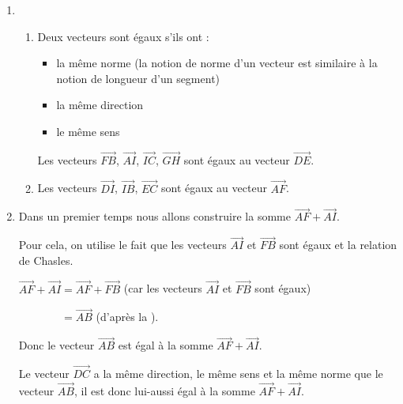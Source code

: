 \begin{corrige}
     \begin{enumerate}
          \item
          \begin{enumerate}[label=\alph*.]
               \item
               Deux vecteurs sont égaux s'ils ont :
               \begin{itemize}
                    \item
                    la même norme (la notion de norme d'un vecteur est similaire à la notion de longueur d'un segment)
                    \item
                    la même direction
                    \item
                    le même sens
               \end{itemize}

\begin{center}
\end{center}

               Les vecteurs $\overrightarrow{FB}$, $\overrightarrow{AI}$, $\overrightarrow{IC}$, $\overrightarrow{GH}$ sont égaux au vecteur $\overrightarrow{DE}$.
               \item

\begin{center}
\end{center}
               Les vecteurs $\overrightarrow{DI}$, $\overrightarrow{IB}$, $\overrightarrow{EC}$ sont égaux au vecteur $\overrightarrow{AF}$.
          \end{enumerate}
          \item
          Dans un premier temps nous allons construire la somme $\overrightarrow{AF} + \overrightarrow{AI}$.
          \par
          Pour cela, on utilise le fait que les vecteurs $\overrightarrow{AI}$ et $\overrightarrow{FB}$ sont égaux et la relation de Chasles.
          \par
          $\overrightarrow{AF} + \overrightarrow{AI} = \overrightarrow{AF} +  \overrightarrow{FB}$ (car les  vecteurs $\overrightarrow{AI}$ et $\overrightarrow{FB}$ sont égaux)
          \par
          $\phantom{{AF} + {AI}} = \overrightarrow{AB}$ (d'après la ).
          \par
          Donc le vecteur $\overrightarrow{AB}$ est égal à la somme $\overrightarrow{AF} + \overrightarrow{AI}$.
\begin{center}
\end{center}
          Le vecteur $\overrightarrow{DC}$ a la même direction, le même sens et la même norme que le vecteur $\overrightarrow{AB}$, il est donc lui-aussi égal à la somme $\overrightarrow{AF} + \overrightarrow{AI}$.
     \end{enumerate}
\end{corrige}
